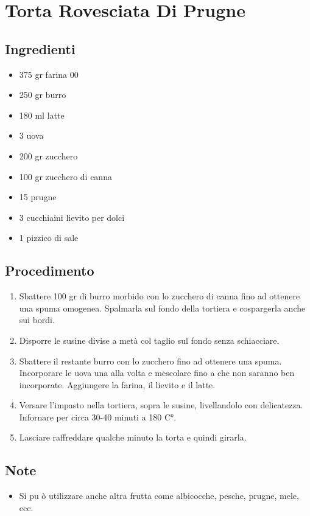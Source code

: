 \section{Torta Rovesciata Di Prugne}
\subsection{Ingredienti}
\begin{itemize}
\item 375 gr farina 00  
\item 250 gr burro  
\item 180 ml latte  
\item 3 uova  
\item 200 gr zucchero  
\item 100 gr zucchero di canna  
\item 15 prugne  
\item 3 cucchiaini lievito per dolci  
\item 1 pizzico di sale
\end{itemize}
\subsection{Procedimento}
\begin{enumerate}
\item  Sbattere 100 gr di burro morbido con lo zucchero di canna fino ad ottenere una spuma omogenea. Spalmarla sul fondo della tortiera e cospargerla anche sui bordi.   
\item  Disporre le susine divise a metà col taglio sul fondo senza schiacciare.  
\item  Sbattere il restante burro con lo zucchero fino ad ottenere una spuma. Incorporare le uova una alla volta e mescolare fino a che non saranno ben incorporate. Aggiungere la farina, il lievito e il latte.  
\item  Versare l'impasto nella tortiera, sopra le susine, livellandolo con delicatezza. Infornare per circa 30-40 minuti a 180 C°.  
\item  Lasciare raffreddare qualche minuto la torta e quindi girarla.
\end{enumerate}
\subsection{Note}
\begin{itemize}
\item Si pu ò utilizzare anche altra frutta come albicocche, pesche, prugne, mele, ecc.
\end{itemize}
